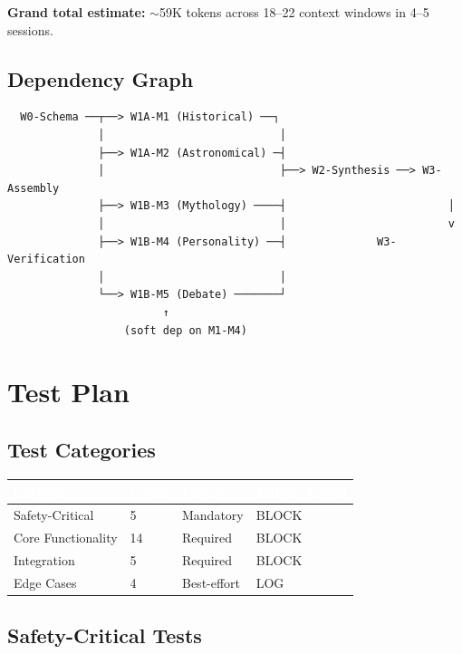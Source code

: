 \documentclass[11pt,letterpaper]{article}
\newcommand{\tableheader}[1]{\textbf{\sffamily\textcolor{white}{#1}}}
\begin{document}
\textbf{Grand total estimate:} $\sim$59K tokens across 18--22 context windows in 4--5 sessions.

\subsection{Dependency Graph}

\begin{asciibox}
\begin{verbatim}
  W0-Schema ──┬──> W1A-M1 (Historical) ──┐
              │                           │
              ├──> W1A-M2 (Astronomical) ─┤
              │                           ├──> W2-Synthesis ──> W3-Assembly
              ├──> W1B-M3 (Mythology) ────┤                         │
              │                           │                         v
              ├──> W1B-M4 (Personality) ──┤              W3-Verification
              │                           │
              └──> W1B-M5 (Debate) ───────┘
                        ↑
                  (soft dep on M1-M4)
\end{verbatim}
\end{asciibox}

\section{Test Plan}

\subsection{Test Categories}

\begin{center}
\begin{tabularx}{\textwidth}{L{3cm}C{1.5cm}C{1.5cm}C{2cm}}
\toprule
{}
\tableheader{Category} & \tableheader{Count} & \tableheader{Priority} & \tableheader{Failure Action} \\
\midrule
Safety-Critical & 5 & Mandatory & BLOCK \\
Core Functionality & 14 & Required & BLOCK \\
Integration & 5 & Required & BLOCK \\
Edge Cases & 4 & Best-effort & LOG \\
\bottomrule
\end{tabularx}
\end{center}

\subsection{Safety-Critical Tests}
\end{document}
